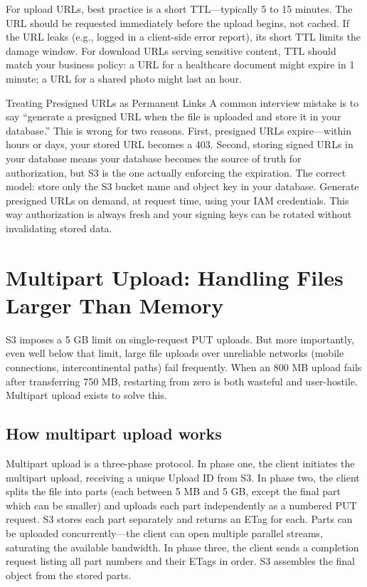 \documentclass[11pt,a4paper]{article}
\begin{document}
For upload URLs, best practice is a short TTL---typically 5 to 15 minutes. The URL should be requested immediately before the upload begins, not cached. If the URL leaks (e.g., logged in a client-side error report), its short TTL limits the damage window. For download URLs serving sensitive content, TTL should match your business policy: a URL for a healthcare document might expire in 1 minute; a URL for a shared photo might last an hour.

\begin{trapbox}{Treating Presigned URLs as Permanent Links}
A common interview mistake is to say ``generate a presigned URL when the file is uploaded and store it in your database.'' This is wrong for two reasons. First, presigned URLs expire---within hours or days, your stored URL becomes a 403. Second, storing signed URLs in your database means your database becomes the source of truth for authorization, but S3 is the one actually enforcing the expiration. The correct model: store only the S3 bucket name and object key in your database. Generate presigned URLs on demand, at request time, using your IAM credentials. This way authorization is always fresh and your signing keys can be rotated without invalidating stored data.
\end{trapbox}

\section{Multipart Upload: Handling Files Larger Than Memory}

S3 imposes a 5 GB limit on single-request PUT uploads. But more importantly, even well below that limit, large file uploads over unreliable networks (mobile connections, intercontinental paths) fail frequently. When an 800 MB upload fails after transferring 750 MB, restarting from zero is both wasteful and user-hostile. Multipart upload exists to solve this.

\subsection{How multipart upload works}

Multipart upload is a three-phase protocol. In phase one, the client initiates the multipart upload, receiving a unique Upload ID from S3. In phase two, the client splits the file into parts (each between 5 MB and 5 GB, except the final part which can be smaller) and uploads each part independently as a numbered PUT request. S3 stores each part separately and returns an ETag for each. Parts can be uploaded concurrently---the client can open multiple parallel streams, saturating the available bandwidth. In phase three, the client sends a completion request listing all part numbers and their ETags in order. S3 assembles the final object from the stored parts.
\end{document}
